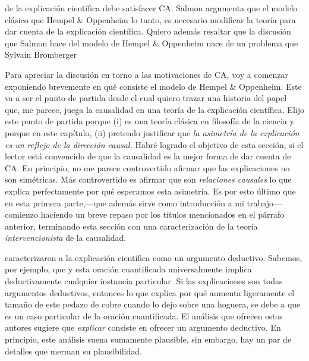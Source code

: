de la explicación científica debe satisfacer CA. Salmon
argumenta que el modelo clásico que Hempel $\&$ Oppenheim
lo tanto, es necesario modificar la teoría para dar cuenta
de la explicación científica. Quiero además resaltar que la
discusión que Salmon hace del modelo de Hempel $\&$
Oppenheim nace de un problema que  Sylvain Bromberger

Para apreciar la discusión en torno a las motivaciones de
CA, voy a comenzar exponiendo brevemente en qué consiste el
modelo de Hempel $\&$ Oppenheim. Este va a ser el punto de
partida desde el cual quiero trazar una historia del papel
que, me parece, juega la causalidad en una teoría de la
explicación científica. Elijo este punto de partida porque
(i) es una teoría clásica en filosofía de la ciencia y
porque en este capítulo, (ii) pretendo justificar que
\emph{la asimetría de la explicación es un reflejo de la
dirección causal.} Habré logrado el objetivo de esta
sección, si el lector está convencido de que la causalidad
es la mejor forma de dar cuenta de CA.
En principio, no me parece controvertido afirmar que las
explicaciones no son simétricas. Más controvertido es
afirmar que son \emph{relaciones causales} lo que explica perfectamente
por qué esperamos esta asimetría. Es por esto último que
en esta primera parte,---que además sirve como introducción
a mi trabajo---comienzo haciendo un breve repaso por los
títulos mencionados en el párrafo anterior, terminando esta
sección con una caracterización de la teoría \emph{intervencionista} de
la causalidad.


caracterizaron  a la explicación científica como un
argumento deductivo. Sabemos, por ejemplo, que  y esta oración
cuantificada universalmente implica deductivamente cualquier
instancia particular. Si las explicaciones son todas
argumentos deductivos, entonces lo que explica por qué
aumenta ligeramente el tamaño de este pedazo de cobre cuando
lo dejo sobre una hoguera, se debe a que es un caso
particular de la oración cuantificada. El análisis que
ofrecen estos autores sugiere que \emph{explicar} consiste
en ofrecer un argumento deductivo. En principio, este análisis suena
sumamente plausible, sin embargo, hay un par de detalles que
merman su plausibilidad.

